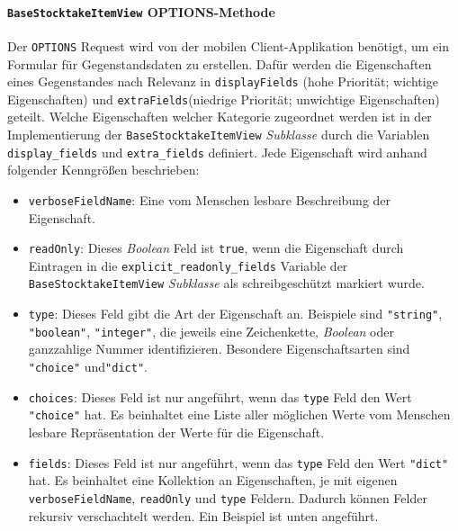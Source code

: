 \hypertarget{basestocktakeitemview-options-methode}{%
\paragraph{\texorpdfstring{\texttt{BaseStocktakeItemView}
OPTIONS-Methode}{BaseStocktakeItemView OPTIONS-Methode}}\label{basestocktakeitemview-options-methode}}

Der \texttt{OPTIONS} Request wird von der mobilen Client-Applikation
benötigt, um ein Formular für Gegenstandsdaten zu erstellen. Dafür
werden die Eigenschaften eines Gegenstandes nach Relevanz in
\texttt{displayFields} (hohe Priorität; wichtige Eigenschaften) und
\texttt{extraFields}(niedrige Priorität; unwichtige Eigenschaften)
geteilt. Welche Eigenschaften welcher Kategorie zugeordnet werden ist in
der Implementierung der \texttt{BaseStocktakeItemView}
\emph{Subklasse}
durch die Variablen \texttt{display\_fields} und \texttt{extra\_fields}
definiert. Jede Eigenschaft wird anhand folgender Kenngrößen
beschrieben:

\begin{itemize}
\tightlist
\item
  \texttt{verboseFieldName}: Eine vom Menschen lesbare Beschreibung der
  Eigenschaft.
\item
  \texttt{readOnly}: Dieses
  \emph{Boolean}
  Feld ist \texttt{true}, wenn die Eigenschaft durch Eintragen in die
  \texttt{explicit\_readonly\_fields} Variable der
  \texttt{BaseStocktakeItemView}
  \emph{Subklasse}
  als schreibgeschützt markiert wurde.
\item
  \texttt{type}: Dieses Feld gibt die Art der Eigenschaft an. Beispiele
  sind \texttt{"string"}, \texttt{"boolean"}, \texttt{"integer"}, die
  jeweils eine Zeichenkette,
  \emph{Boolean}
  oder ganzzahlige Nummer identifizieren. Besondere Eigenschaftsarten
  sind \texttt{"choice"} und\texttt{"dict"}.
\item
  \texttt{choices}: Dieses Feld ist nur angeführt, wenn das
  \texttt{type} Feld den Wert \texttt{"choice"} hat. Es beinhaltet eine
  Liste aller möglichen Werte \inkl{} vom Menschen lesbare
  Repräsentation der Werte für die Eigenschaft.
\item
  \texttt{fields}: Dieses Feld ist nur angeführt, wenn das \texttt{type}
  Feld den Wert \texttt{"dict"} hat. Es beinhaltet eine Kollektion an
  Eigenschaften, je mit eigenen \texttt{verboseFieldName},
  \texttt{readOnly} und \texttt{type} Feldern. Dadurch können Felder
  rekursiv verschachtelt werden. Ein Beispiel ist unten angeführt.
\end{itemize}

